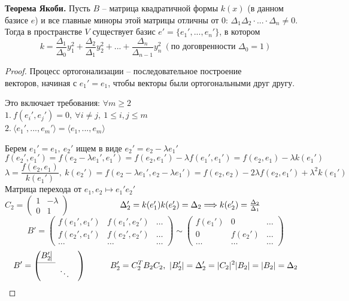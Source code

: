 \documentclass[a4paper, 12pt]{article}
\newcommand\tab[1][.5cm]{\hspace*{#1}}
\theoremstyle{definition}
\begin{document}
    \textbf{Теорема Якоби.} Пусть $B$ -- матрица квадратичной
    формы $k(x)$ (в данном базисе $e$) и все главные миноры
    этой матрицы отличны от 0: $\Delta_1\Delta_2\cdot...
    \cdot \Delta_n \neq 0$. Тогда в пространстве $V$ 
    существует базис $e' = \{e_1',...,e_n'\}$, в котором 
    $$k = \frac{\Delta_1}{\Delta_0}y_1^2 + 
    \frac{\Delta_2}{\Delta_1}y_2^2 +...+
    \frac{\Delta_n}{\Delta_{n-1}}y_n^2\ (\text{по 
    договренности }\Delta_0 = 1)$$
    \begin{proof}
        Процесс ортогонализации -- последовательное построение
        \\векторов, начиная с $e_1' = e_1$, чтобы векторы были 
        ортогональными друг другу.

        Это включает требования: $\forall m \geq 2$\\
        $1.\ f(e_i', e_j') = 0,\ \forall i \neq j,\ 
        1 \leq i,j \leq m$\\
        $2.\ \langle e_1',...,e_m'\rangle = \langle e_1,...,
        e_m\rangle$

        Берем $e_1' = e_1,\ e_2'$ ищем в виде $e_2' = e_2 - 
        \lambda e_1'$
        $$f(e_2',e_1') = f(e_2 - \lambda e_1', e_1') = 
        f(e_2, e_1') - \lambda f(e_1',e_1') = 
        f(e_2,e_1) - \lambda k(e_1')$$ 
        $$\lambda = \frac{f(e_2,e_1)}{k(e_1')},\ 
        k(e_2') = f(e_2 - \lambda e_1', e_2 - \lambda e_1') =
        f(e_2,e_2) - 2\lambda f(e_2,e_1') + \lambda^2 k(e_1')$$
        Матрица перехода от $e_1, e_2 \longmapsto e_1' e_2'$\\
        $C_2 = \begin{pmatrix}
            1 & -\lambda\\
            0 & 1
        \end{pmatrix}$
        $\tab[2cm]\Delta_2' = k(e_1')k(e_2') = \Delta_2 
        \Longrightarrow k(e_2') = \frac{\Delta_2}{\Delta_1}$
        $$B' = \begin{pmatrix}
            f(e_1', e_1') & f(e_1', e_2') & \dots\\
            f(e_2', e_1') & f(e_2', e_2') & \dots\\
            \dots & \dots & \dots
        \end{pmatrix} \sim
        \begin{pmatrix}
            f(e_1') & 0 & \dots\\
            0 & f(e_2') & \dots\\
            \dots & \dots & \dots
        \end{pmatrix}$$
        $$B' =\begin{pmatrix}
            B_2' \vline & \null & \null\\\cmidrule{1-1}
            \null & \ddots & \null
        \end{pmatrix}\tab[1cm]
        B_2' = C_2^TB_2C_2,\ |B_2'| = \Delta_2' = |C_2|^2|B_2|
        = |B_2| = \Delta_2$$
        

\end{proof}
\end{document}
